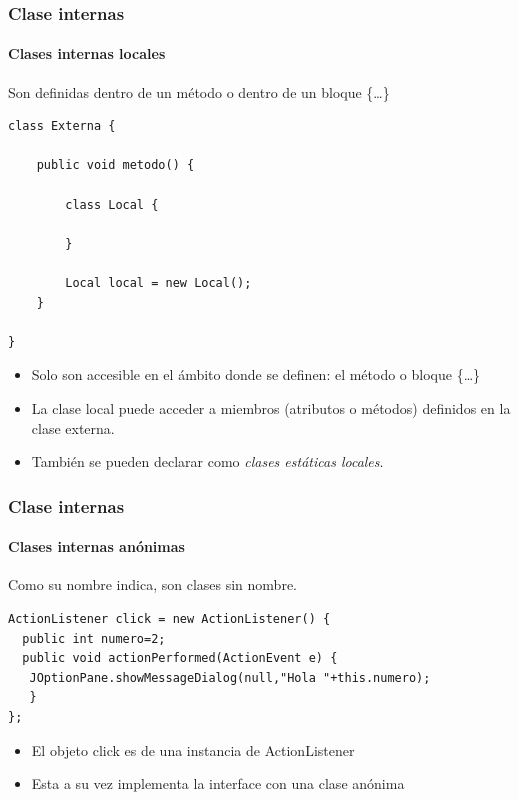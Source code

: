 \documentclass{beamer}
\begin{document}
\begin{frame}[fragile]
\frametitle{Clase internas}
\framesubtitle{Clases internas locales}
\begin{small}
Son definidas dentro de un método o dentro de un bloque \{\dots\}

\begin{verbatim}
class Externa {

    public void metodo() {

        class Local {

        }

        Local local = new Local();
    }

}
\end{verbatim}
\end{small}
\pause
\begin{footnotesize}
\begin{itemize}[<+->]
\item Solo son accesible en el ámbito donde se definen: el método o bloque \{\dots\}
\item La clase local puede acceder a miembros (atributos o métodos) definidos en la clase externa.
\item También se pueden declarar como \emph{clases estáticas locales}.
\end{itemize}
\end{footnotesize}
\end{frame}

\begin{frame}[fragile]
\frametitle{Clase internas}
\framesubtitle{Clases internas anónimas}
Como su nombre indica, son clases sin nombre.
\begin{verbatim}
ActionListener click = new ActionListener() {
  public int numero=2;
  public void actionPerformed(ActionEvent e) {
   JOptionPane.showMessageDialog(null,"Hola "+this.numero);
   }
};
\end{verbatim}
\pause
\begin{itemize}[<+->]
\item El objeto click es de una instancia de ActionListener
\item Esta a su vez implementa la interface con una clase anónima
\end{itemize}
\end{frame}
\end{document}
